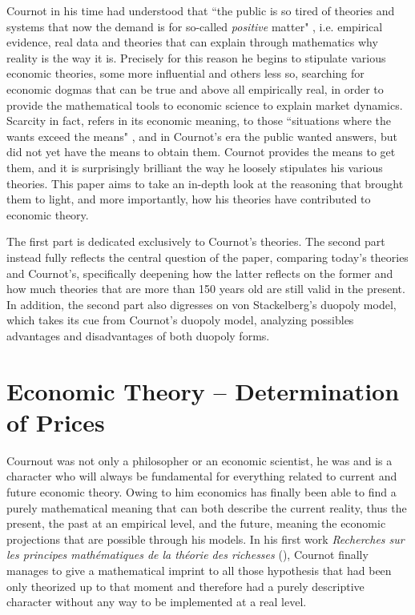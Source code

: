 \documentclass[12pt]{article}
\numberwithin{equation}{subsection}
\let\oldsection\section%
\renewcommand{\section}{%
  \renewcommand{\theequation}{\thesection.\arabic{equation}}%
  \oldsection}%
\begin{document}
Cournot in his time had understood that ``the public is so tired of theories and systems that now the demand is for so-called \emph{positive} matter" \cite[p.1]{cournot1897researches}, i.e. empirical evidence, real data and theories that can explain through mathematics why reality is the way it is. Precisely for this reason he begins to stipulate various economic theories, some more influential and others less so, searching for economic dogmas that can be true and above all empirically real, in order to provide the mathematical tools to economic science to explain market dynamics. Scarcity in fact, refers in its economic meaning, to those ``situations where the wants exceed the means" \cite[p.4]{Kolmar_2022}, and in Cournot's era the public wanted answers, but did not yet have the means to obtain them. Cournot provides the means to get them, and it is surprisingly brilliant the way he loosely stipulates his various theories. This paper aims to take an in-depth look at the reasoning that brought them to light, and more importantly, how his theories have contributed to economic theory.

The first part is dedicated exclusively to Cournot's theories. The second part instead fully reflects the central question of the paper, comparing today's theories and Cournot's, specifically deepening how the latter reflects on the former and how much theories that are more than 150 years old  are still valid in the present. In addition, the second part also digresses on von Stackelberg's duopoly model, which takes its cue from Cournot's duopoly model, analyzing possibles advantages and disadvantages of both duopoly forms.
\newpage
\section{Economic Theory -- Determination of Prices}
\label{sec:eco}
Cournout was not only a philosopher or an economic scientist, he was and is a character who will always be fundamental for everything related to current and future economic theory. Owing to him economics has finally been able to find a purely mathematical meaning that can both describe the current reality, thus the present, the past at an empirical level, and the future, meaning the economic projections that are possible through his models. In his first work \emph{Recherches sur les principes mathématiques de la théorie des richesses} (\citeyear{cournot1838recherches}), Cournot finally manages to give a mathematical imprint to all those hypothesis that had been only theorized up to that moment and therefore had a purely descriptive character without any way to be implemented at a real level.
\end{document}
